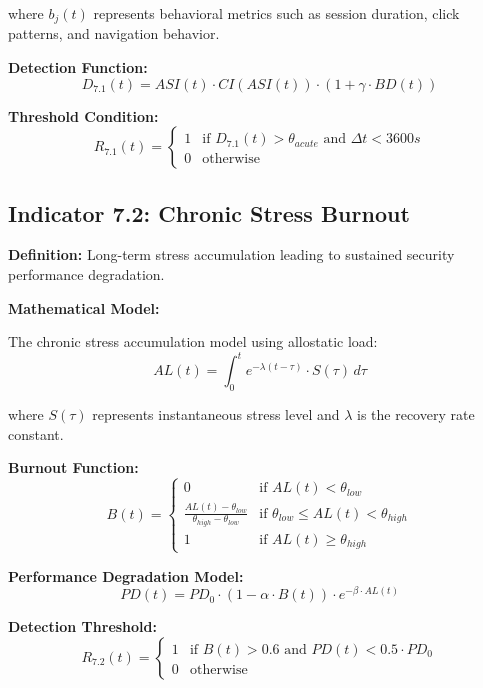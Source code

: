 \documentclass[11pt,a4paper]{article}
\begin{document}
where $b_j(t)$ represents behavioral metrics such as session duration, click patterns, and navigation behavior.

\textbf{Detection Function:}
\begin{equation}
D_{7.1}(t) = ASI(t) \cdot CI(ASI(t)) \cdot \left(1 + \gamma \cdot BD(t)\right)
\end{equation}

\textbf{Threshold Condition:}
\begin{equation}
R_{7.1}(t) = \begin{cases}
1 & \text{if } D_{7.1}(t) > \theta_{acute} \text{ and } \Delta t < 3600s \\
0 & \text{otherwise}
\end{cases}
\end{equation}

\subsection{Indicator 7.2: Chronic Stress Burnout}

\textbf{Definition:} Long-term stress accumulation leading to sustained security performance degradation.

\textbf{Mathematical Model:}

The chronic stress accumulation model using allostatic load:
\begin{equation}
AL(t) = \int_0^t e^{-\lambda(t-\tau)} \cdot S(\tau) \, d\tau
\end{equation}

where $S(\tau)$ represents instantaneous stress level and $\lambda$ is the recovery rate constant.

\textbf{Burnout Function:}
\begin{equation}
B(t) = \begin{cases}
0 & \text{if } AL(t) < \theta_{low} \\
\frac{AL(t) - \theta_{low}}{\theta_{high} - \theta_{low}} & \text{if } \theta_{low} \leq AL(t) < \theta_{high} \\
1 & \text{if } AL(t) \geq \theta_{high}
\end{cases}
\end{equation}

\textbf{Performance Degradation Model:}
\begin{equation}
PD(t) = PD_0 \cdot (1 - \alpha \cdot B(t)) \cdot e^{-\beta \cdot AL(t)}
\end{equation}

\textbf{Detection Threshold:}
\begin{equation}
R_{7.2}(t) = \begin{cases}
1 & \text{if } B(t) > 0.6 \text{ and } PD(t) < 0.5 \cdot PD_0 \\
0 & \text{otherwise}
\end{cases}
\end{equation}
\end{document}
